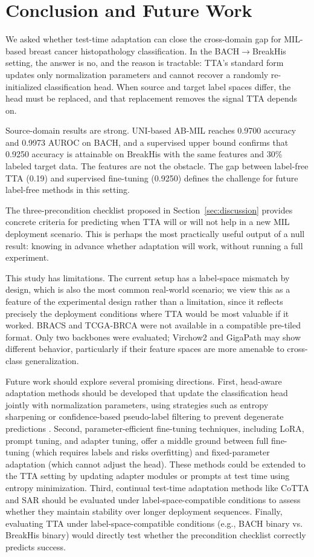 \documentclass[conference]{IEEEtran}
\begin{document}
\section{Conclusion and Future Work}
\label{sec:conclusion}

We asked whether test-time adaptation can close the cross-domain gap for MIL-based breast cancer histopathology classification. In the BACH$\rightarrow$BreakHis setting, the answer is no, and the reason is tractable: TTA's standard form updates only normalization parameters and cannot recover a randomly re-initialized classification head. When source and target label spaces differ, the head must be replaced, and that replacement removes the signal TTA depends on.

Source-domain results are strong. UNI-based AB-MIL reaches 0.9700 accuracy and 0.9973 AUROC on BACH, and a supervised upper bound confirms that 0.9250 accuracy is attainable on BreakHis with the same features and 30\% labeled target data. The features are not the obstacle. The gap between label-free TTA (0.19) and supervised fine-tuning (0.9250) defines the challenge for future label-free methods in this setting.

The three-precondition checklist proposed in Section~\ref{sec:discussion} provides concrete criteria for predicting when TTA will or will not help in a new MIL deployment scenario. This is perhaps the most practically useful output of a null result: knowing in advance whether adaptation will work, without running a full experiment.

This study has limitations. The current setup has a label-space mismatch by design, which is also the most common real-world scenario; we view this as a feature of the experimental design rather than a limitation, since it reflects precisely the deployment conditions where TTA would be most valuable if it worked. BRACS and TCGA-BRCA were not available in a compatible pre-tiled format. Only two backbones were evaluated; Virchow2 and GigaPath may show different behavior, particularly if their feature spaces are more amenable to cross-class generalization.

Future work should explore several promising directions. First, head-aware adaptation methods should be developed that update the classification head jointly with normalization parameters, using strategies such as entropy sharpening or confidence-based pseudo-label filtering to prevent degenerate predictions \cite{niu2023towards}. Second, parameter-efficient fine-tuning techniques, including LoRA, prompt tuning, and adapter tuning, offer a middle ground between full fine-tuning (which requires labels and risks overfitting) and fixed-parameter adaptation (which cannot adjust the head). These methods could be extended to the TTA setting by updating adapter modules or prompts at test time using entropy minimization. Third, continual test-time adaptation methods like CoTTA \cite{wang2022cotta} and SAR \cite{niu2023towards} should be evaluated under label-space-compatible conditions to assess whether they maintain stability over longer deployment sequences. Finally, evaluating TTA under label-space-compatible conditions (e.g., BACH binary vs. BreakHis binary) would directly test whether the precondition checklist correctly predicts success.



\end{document}
